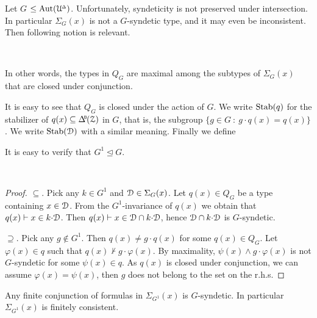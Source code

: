 Let \emph{$G$\/} $\le{\rm Aut}(\EuScript U\kern-.2ex^{\scriptscriptstyle\Delta})$.
Unfortunately, syndeticity is not preserved under intersection.
In particular $\Sigma_G(x)$ is not a $G$-syndetic type, and it may even be inconsistent.
Then following notion is relevant.

\begin{definition}\label{def_Q}\ 

  \smallskip

  In other words, the types in $Q_G$ are maximal among the subtypes of $\Sigma_G(x)$ that are closed under conjunction.
\end{definition}

It is easy to see that $Q_G$ is closed under the action of $G$.
We write ${\rm Stab}(q)$ for the stabilizer of $q(x)\subseteq\BDelta(\Z)$ in $G$, that is, the subgroup $\{g\in G\ :\ g{\cdot}q(x)=q(x)\}$.
We write ${\rm Stab}(\EuScript D)$ with a similar meaning.
Finally we define


It is easy to verify that $G^1\trianglelefteq G$.

\begin{proposition}\label{prop_StabQ}\ \smallskip

  \smallskip
\end{proposition}

\begin{proof}
  $\subseteq$.
  Pick any $k\in G^1$ and $\EuScript D\in\Sigma_G(x)$.
  Let $q(x)\in Q_G$ be a type containing $x\in\EuScript D$.
  From the $G^1$-invariance of $q(x)$ we obtain that $q(x)\vdash x\in k{\cdot}\EuScript D$.
  Then $q(x)\vdash x\in \EuScript D\cap k{\cdot}\EuScript D$, hence $\EuScript D\cap k{\cdot}\EuScript D$ is $G$-syndetic.

  $\supseteq$.
  Pick any $g\notin G^1$.
  Then $q(x)\neq g{\cdot}q(x)$ for some $q(x)\in Q_G$.
  Let $\varphi(x)\in q$ such that $q(x)\not\vdash g{\cdot}\varphi(x)$.
  By maximality, $\psi(x)\wedge g{\cdot}\varphi(x)$ is not $G$-syndetic for some $\psi(x)\in q$.
  As $q(x)$ is closed under conjunction, we can assume $\varphi(x)=\psi(x)$, then $g$ does not belong to the set on the r.h.s.
\end{proof}

\begin{theorem}\label{thm_gammaK}
  Any finite conjunction of formulas in $\Sigma_{G^1}(x)$ is $G$-syndetic.
  In particular $\Sigma_{G^1}(x)$ is finitely consistent.
\end{theorem}

